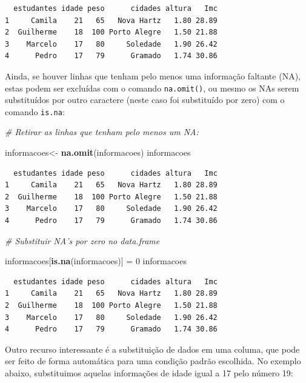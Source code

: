 \documentclass[12pt,brazil,oneside]{book}
\newenvironment{Shaded}{\begin{snugshade}}{\end{snugshade}}
\newcommand{\CommentTok}[1]{\textcolor[rgb]{0.56,0.35,0.01}{\textit{#1}}}
\newcommand{\DecValTok}[1]{\textcolor[rgb]{0.00,0.00,0.81}{#1}}
\newcommand{\KeywordTok}[1]{\textcolor[rgb]{0.13,0.29,0.53}{\textbf{#1}}}
\newcommand{\NormalTok}[1]{#1}
\newcommand{\StringTok}[1]{\textcolor[rgb]{0.31,0.60,0.02}{#1}}
\begin{document}
\begin{verbatim}
  estudantes idade peso      cidades altura   Imc
1     Camila    21   65   Nova Hartz   1.80 28.89
2  Guilherme    18  100 Porto Alegre   1.50 21.88
3    Marcelo    17   80     Soledade   1.90 26.42
4      Pedro    17   79      Gramado   1.74 30.86
\end{verbatim}

Ainda, se houver linhas que tenham pelo menos uma informação faltante
(NA), estas podem ser excluídas com o comando \texttt{na.omit()}, ou
mesmo os NAs serem substituídos por outro caractere (neste caso foi
substituído por zero) com o comando \texttt{is.na}:

\begin{Shaded}
\begin{Highlighting}[]
\CommentTok{# Retirar as linhas que tenham pelo menos um NA:}

\NormalTok{informacoes<-}\StringTok{ }\KeywordTok{na.omit}\NormalTok{(informacoes)}
\NormalTok{informacoes}
\end{Highlighting}
\end{Shaded}

\begin{verbatim}
  estudantes idade peso      cidades altura   Imc
1     Camila    21   65   Nova Hartz   1.80 28.89
2  Guilherme    18  100 Porto Alegre   1.50 21.88
3    Marcelo    17   80     Soledade   1.90 26.42
4      Pedro    17   79      Gramado   1.74 30.86
\end{verbatim}

\begin{Shaded}
\begin{Highlighting}[]
\CommentTok{# Substituir NA's por zero no data.frame}

\NormalTok{informacoes[}\KeywordTok{is.na}\NormalTok{(informacoes)] =}\StringTok{ }\DecValTok{0}
\NormalTok{informacoes}
\end{Highlighting}
\end{Shaded}

\begin{verbatim}
  estudantes idade peso      cidades altura   Imc
1     Camila    21   65   Nova Hartz   1.80 28.89
2  Guilherme    18  100 Porto Alegre   1.50 21.88
3    Marcelo    17   80     Soledade   1.90 26.42
4      Pedro    17   79      Gramado   1.74 30.86
\end{verbatim}

Outro recurso interessante é a substituição de dados em uma columa, que
pode ser feito de forma automática para uma condição padrão escolhida.
No exemplo abaixo, substituimos aquelas informações de idade igual a 17
pelo número 19:
\end{document}
